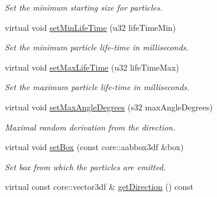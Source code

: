 \begin{DoxyCompactItemize}
\begin{DoxyCompactList}\small\item\em Set the minimum starting size for particles. \end{DoxyCompactList}\item 
\hypertarget{classirr_1_1scene_1_1_c_particle_box_emitter_a88fdebe95f3e5409515598dc4b83b4ca}{virtual void \hyperlink{classirr_1_1scene_1_1_c_particle_box_emitter_a88fdebe95f3e5409515598dc4b83b4ca}{set\-Min\-Life\-Time} (u32 life\-Time\-Min)}\label{classirr_1_1scene_1_1_c_particle_box_emitter_a88fdebe95f3e5409515598dc4b83b4ca}

\begin{DoxyCompactList}\small\item\em Set the minimum particle life-\/time in milliseconds. \end{DoxyCompactList}\item 
\hypertarget{classirr_1_1scene_1_1_c_particle_box_emitter_a7002700e4a921f6bc3d236b2697d6670}{virtual void \hyperlink{classirr_1_1scene_1_1_c_particle_box_emitter_a7002700e4a921f6bc3d236b2697d6670}{set\-Max\-Life\-Time} (u32 life\-Time\-Max)}\label{classirr_1_1scene_1_1_c_particle_box_emitter_a7002700e4a921f6bc3d236b2697d6670}

\begin{DoxyCompactList}\small\item\em Set the maximum particle life-\/time in milliseconds. \end{DoxyCompactList}\item 
\hypertarget{classirr_1_1scene_1_1_c_particle_box_emitter_a0515b97a058603a75f0eb660c3131942}{virtual void \hyperlink{classirr_1_1scene_1_1_c_particle_box_emitter_a0515b97a058603a75f0eb660c3131942}{set\-Max\-Angle\-Degrees} (s32 max\-Angle\-Degrees)}\label{classirr_1_1scene_1_1_c_particle_box_emitter_a0515b97a058603a75f0eb660c3131942}

\begin{DoxyCompactList}\small\item\em Maximal random derivation from the direction. \end{DoxyCompactList}\item 
\hypertarget{classirr_1_1scene_1_1_c_particle_box_emitter_a409975f5c5c2c433c01149aa593ee392}{virtual void \hyperlink{classirr_1_1scene_1_1_c_particle_box_emitter_a409975f5c5c2c433c01149aa593ee392}{set\-Box} (const core\-::aabbox3df \&box)}\label{classirr_1_1scene_1_1_c_particle_box_emitter_a409975f5c5c2c433c01149aa593ee392}

\begin{DoxyCompactList}\small\item\em Set box from which the particles are emitted. \end{DoxyCompactList}\item 
\hypertarget{classirr_1_1scene_1_1_c_particle_box_emitter_afdb07e118e162453464db0a56e4e304e}{virtual const core\-::vector3df \& \hyperlink{classirr_1_1scene_1_1_c_particle_box_emitter_afdb07e118e162453464db0a56e4e304e}{get\-Direction} () const }\label{classirr_1_1scene_1_1_c_particle_box_emitter_afdb07e118e162453464db0a56e4e304e}


\end{DoxyCompactItemize}
